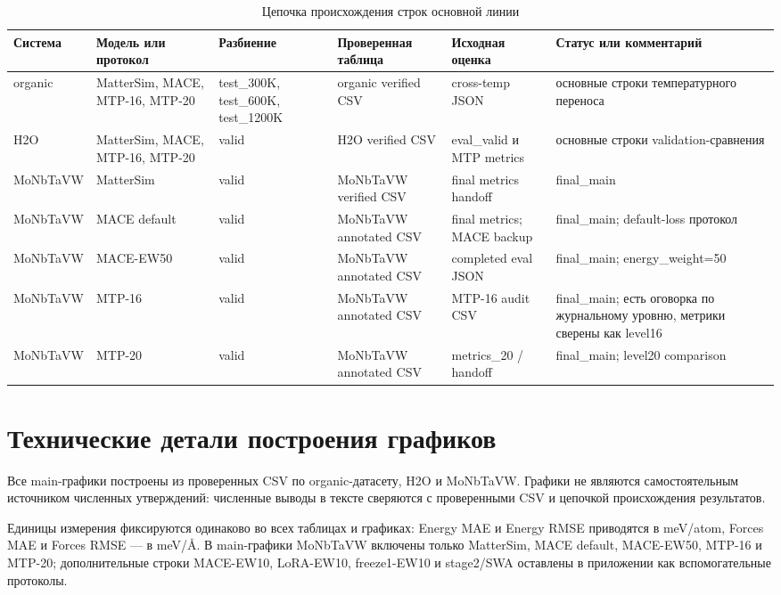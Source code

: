 \begin{table}[ht]
\centering
\scriptsize
\caption{Цепочка происхождения строк основной линии}
\label{tab:appendix_source_chain}
\setlength{\tabcolsep}{2pt}
\begin{tabularx}{\textwidth}{@{}l l l X X X@{}}
\toprule
Система & Модель или протокол & Разбиение & Проверенная таблица & Исходная оценка & Статус или комментарий \\
\midrule
organic & MatterSim, MACE, MTP-16, MTP-20 & test\_300K, test\_600K, test\_1200K & organic verified CSV & cross-temp JSON & основные строки температурного переноса \\
H2O & MatterSim, MACE, MTP-16, MTP-20 & valid & H2O verified CSV & eval\_valid и MTP metrics & основные строки validation-сравнения \\
MoNbTaVW & MatterSim & valid & MoNbTaVW verified CSV & final metrics handoff & final\_main \\
MoNbTaVW & MACE default & valid & MoNbTaVW annotated CSV & final metrics; MACE backup & final\_main; default-loss протокол \\
MoNbTaVW & MACE-EW50 & valid & MoNbTaVW annotated CSV & completed eval JSON & final\_main; energy\_weight=50 \\
MoNbTaVW & MTP-16 & valid & MoNbTaVW annotated CSV & MTP-16 audit CSV & final\_main; есть оговорка по журнальному уровню, метрики сверены как level16 \\
MoNbTaVW & MTP-20 & valid & MoNbTaVW annotated CSV & metrics\_20 / handoff & final\_main; level20 comparison \\
\bottomrule
\end{tabularx}
\end{table}

\section{Технические детали построения графиков}

Все main-графики построены из проверенных CSV по organic-датасету, H2O и MoNbTaVW. Графики не являются самостоятельным источником численных утверждений: численные выводы в тексте сверяются с проверенными CSV и цепочкой происхождения результатов.

Единицы измерения фиксируются одинаково во всех таблицах и графиках: Energy MAE и Energy RMSE приводятся в meV/atom, Forces MAE и Forces RMSE — в meV/Å. В main-графики MoNbTaVW включены только MatterSim, MACE default, MACE-EW50, MTP-16 и MTP-20; дополнительные строки MACE-EW10, LoRA-EW10, freeze1-EW10 и stage2/SWA оставлены в приложении как вспомогательные протоколы.
